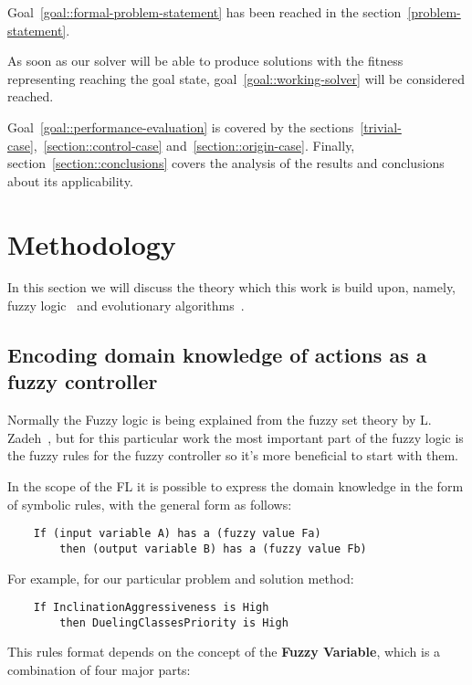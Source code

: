 \documentclass[12pt, a4paper]{report}
\begin{document}
	Goal~\ref{goal::formal-problem-statement} has been reached in the section~\ref{problem-statement}.
	
	As soon as our solver will be able to produce solutions with the fitness representing reaching the goal state, goal~\ref{goal::working-solver} will be considered reached.
	
	Goal~\ref{goal::performance-evaluation} is covered by the sections~\ref{trivial-case},~\ref{section::control-case} and~\ref{section::origin-case}.
	Finally, section~\ref{section::conclusions} covers the analysis of the results and conclusions about its applicability.
	
	\chapter{Methodology}\label{methodology}

  In this section we will discuss the theory which this work is build upon, namely, fuzzy logic~\cite{ray2014softcomputing} and evolutionary algorithms~\cite{mitchell1999geneticalgorithms}.

	\section{Encoding domain knowledge of actions as a fuzzy controller}

  Normally the Fuzzy logic is being explained from the fuzzy set theory by L. Zadeh~\cite{zadeh1965fuzzy}, but for this particular work the most important part of the fuzzy logic is the fuzzy rules for the fuzzy controller so it's more beneficial to start with them.

  In the scope of the FL it is possible to express the domain knowledge in the form of symbolic rules, with the general form as follows:

  \begin{verbatim}
    If (input variable A) has a (fuzzy value Fa) 
    	then (output variable B) has a (fuzzy value Fb)
  \end{verbatim}

  For example, for our particular problem and solution method:

  \begin{verbatim}
    If InclinationAggressiveness is High 
    	then DuelingClassesPriority is High
  \end{verbatim}

  This rules format depends on the concept of the \textbf{Fuzzy Variable}, which is a combination of four major parts:
\end{document}
